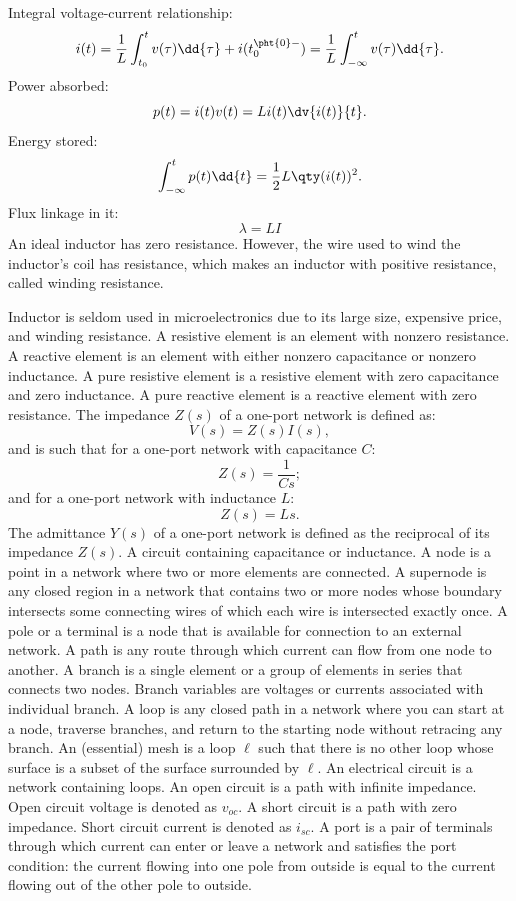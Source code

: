 \documentclass[a4paper,12pt]{article}
\begin{document}
Integral voltage-current relationship:
\[i(t)=\frac{1}{L}\int_{t_0}^tv(\tau)\dd{\tau}+i(t_0^{\pht{0}-})=\frac{1}{L}\int_{-\infty}^tv(\tau)\dd{\tau}.\]
Power absorbed:
\[p(t)=i(t)v(t)=Li(t)\dv{i(t)}{t}.\]
Energy stored:
\[\int_{-\infty}^tp(t)\dd{t}=\frac{1}{2}L\qty(i(t))^2.\]
Flux linkage in it:
\[\lambda=LI\]
An ideal inductor has zero resistance. However, the wire used to wind the inductor's coil has resistance, which makes an inductor with positive resistance, called winding resistance.

Inductor is seldom used in microelectronics due to its large size, expensive price, and winding resistance.
A resistive element is an element with nonzero resistance.
A reactive element is an element with either nonzero capacitance or nonzero inductance.
A pure resistive element is a resistive element with zero capacitance and zero inductance.
A pure reactive element is a reactive element with zero resistance.
The impedance $Z(s)$ of a one-port network is defined as:
\[V(s)=Z(s)I(s),\]
and is such that for a one-port network with capacitance $C$:
\[Z(s)=\frac{1}{Cs};\]
and for a one-port network with inductance $L$:
\[Z(s)=Ls.\]
The admittance $Y(s)$ of a one-port network is defined as the reciprocal of its impedance $Z(s)$.
A circuit containing capacitance or inductance.
A node is a point in a network where two or more elements are connected.
A supernode is any closed region in a network that contains two or more nodes whose boundary intersects some connecting wires of which each wire is intersected exactly once.
A pole or a terminal is a node that is available for connection to an external network.
A path is any route through which current can flow from one node to another.
A branch is a single element or a group of elements in series that connects two nodes. Branch variables are voltages or currents associated with individual branch.
A loop is any closed path in a network where you can start at a node, traverse branches, and return to the starting node without retracing any branch.
An (essential) mesh is a loop $\ell$ such that there is no other loop whose surface is a subset of the surface surrounded by $\ell$.
An electrical circuit is a network containing loops.
An open circuit is a path with infinite impedance. Open circuit voltage is denoted as $v_{oc}$.
A short circuit is a path with zero impedance. Short circuit current is denoted as $i_{sc}$.
A port is a pair of terminals through which current can enter or leave a network and satisfies the port condition: the current flowing into one pole from outside is equal to the current flowing out of the other pole to outside.
\end{document}
